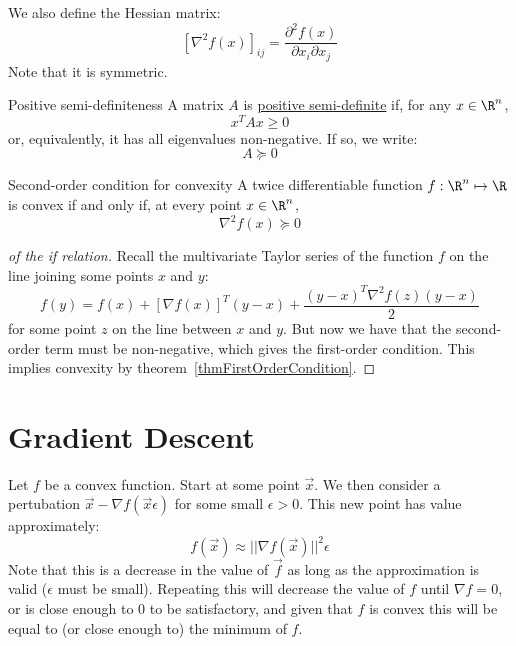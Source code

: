 \documentclass[../Main.tex]{subfiles}
\begin{document}
We also define the Hessian matrix:
\begin{equation}
    \left[\nabla^2 f(x)\right]_{ij} = \frac{\partial^2 f(x)}{\partial x_i \partial x_j}
    \label{eqnHessian}
\end{equation}
Note that it is symmetric.
\begin{definition}{Positive semi-definiteness}
    A matrix $A$ is \underline{positive semi-definite} if, for any $x \in \R^n$,
    \begin{equation}
        x^T A x \geq 0
        \label{eqnPositiveSemiDefinite}
    \end{equation}
    or, equivalently, it has all eigenvalues non-negative. If so, we write:
    \begin{equation*}
        A \succeq 0 
    \end{equation*}
\end{definition}
\begin{theorem}{Second-order condition for convexity}
    A twice differentiable function $f : \R^n \mapsto \R$ is convex if and only if, at every point $x \in \R^n$,
    \begin{equation}
        \nabla^2 f(x) \succeq 0
        \label{eqnSecondOrderCondition}
    \end{equation}
    \label{thmSecondOrderCondition}
\end{theorem}
\begin{proof}[of the if relation]
    Recall the multivariate Taylor series of the function $f$ on the line joining some points $x$ and $y$:
    \begin{equation*}
        f(y) = f(x) + [\nabla f(x)]^T (y - x) + \frac{(y - x)^T \nabla^2 f(z) (y-x)}{2}
    \end{equation*}
    for some point $z$ on the line between $x$ and $y$. But now we have that the second-order term must be non-negative, which gives the first-order condition. This implies convexity by theorem~\ref{thmFirstOrderCondition}.
\end{proof}
\section{Gradient Descent}
Let $f$ be a convex function. Start at some point $\vec{x}$. We then consider a pertubation $\vec{x} - \nabla f(\vec{x} \epsilon)$ for some small $\epsilon > 0$. This new point has value approximately:
\begin{equation*}
    f(\vec{x}) \approx ||\nabla f(\vec{x})||^2 \epsilon
\end{equation*}
Note that this is a decrease in the value of $\vec{f}$ as long as the approximation is valid ($\epsilon$ must be small). Repeating this will decrease the value of $f$ until $\nabla f = 0$, or is close enough to $0$ to be satisfactory, and given that $f$ is convex this will be equal to (or close enough to) the minimum of $f$.
\end{document}
